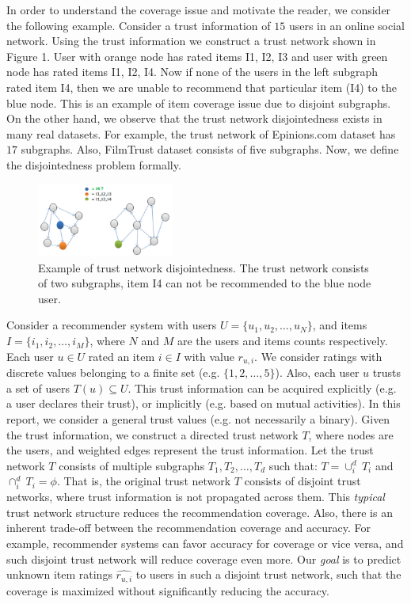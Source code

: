 \documentclass[11pt, conference, onecolumn]{IEEEtran}
\begin{document}
In order to understand the coverage issue and motivate the reader, we consider the following example. Consider a trust information of $15$ users in an online social network. Using the trust information we construct a trust network shown in Figure 1. User with orange node has rated items I1, I2, I3 and user with green node has rated items I1, I2, I4. Now if none of the users in the left subgraph rated item I4, then we are unable to recommend that particular item (I4) to the blue node. This is an example of item coverage issue due to disjoint subgraphs. On the other hand, we observe that the trust network disjointedness exists in many real datasets. For example, the trust network of Epinions.com dataset has $17$ subgraphs. Also, FilmTrust dataset consists of five subgraphs. Now, we define the disjointedness problem formally.

\begin{figure}[tp]
\centering
\includegraphics[width=0.4\textwidth]{fig1}
\caption{Example of trust network disjointedness. The trust network consists of two subgraphs, item I4 can not be recommended to the blue node user.}
\label{fig:motiv}
\end{figure}

Consider a recommender system with users $U = \{u_1, u_2, \dots, u_N \}$, and items $I = \{i_1, i_2, \dots, i_M \}$, where $N$ and $M$ are the users and items counts respectively. Each user $u \in U$ rated an item $i \in I$ with value $r_{u,i}$. We consider ratings with discrete values belonging to a finite set (e.g. $\{1,2,\dots,5\}$). Also, each user $u$ trusts a set of users $T(u) \subseteq U$. This trust information can be acquired explicitly (e.g. a user declares their trust), or implicitly (e.g. based on mutual activities). In this report, we consider a general trust values (e.g. not necessarily a binary). Given the trust information, we construct a directed trust network $T$, where nodes are the users, and weighted edges represent the trust information. Let the trust network $T$ consists of multiple subgraphs $T_1, T_2, \dots, T_d$ such that: $T = \cup_i^d~T_i$ and $\cap_i^d~T_i = \phi$. That is, the original trust network $T$ consists of disjoint trust networks, where trust information is not propagated across them. This \textit{typical} trust network structure reduces the recommendation coverage. Also, there is an inherent trade-off between the recommendation coverage and accuracy. For example, recommender systems can favor accuracy for coverage or vice versa, and such disjoint trust network will reduce coverage even more. Our \textit{goal} is to predict unknown item ratings $\widehat{r_{u,i}}$ to users in such a disjoint trust network, such that the coverage is maximized without significantly reducing the accuracy.
\end{document}
